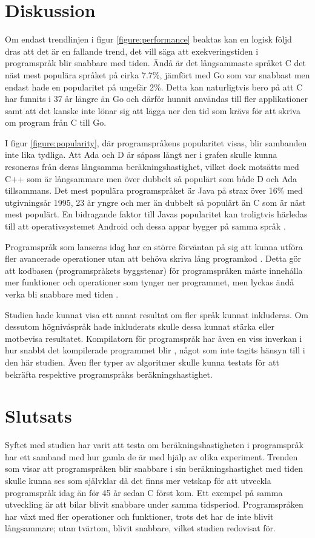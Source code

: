 \documentclass[12pt,swedish]{article}
\begin{document}
\section{Diskussion}
Om endast trendlinjen i figur \ref{figure:performance} beaktas kan en logisk följd dras att det är en fallande trend, det vill säga att exekveringstiden i programspråk blir snabbare med tiden. Ändå är det långsammaste språket C det näst mest populära språket på cirka 7.7\%, jämfört med Go som var snabbast men endast hade en popularitet på ungefär 2\%. Detta kan naturligtvis bero på att C har funnits i 37 år längre än Go och därför hunnit användas till fler applikationer samt att det kanske inte lönar sig att lägga ner den tid som krävs för att skriva om program från C till Go.

I figur \ref{figure:popularity}, där programspråkens popularitet visas, blir sambanden inte lika tydliga. Att Ada och D är såpass långt ner i grafen skulle kunna resoneras från deras långsamma beräkningshastighet, vilket dock motsätts med C++ som är långsammare men över dubbelt så populärt som både D och Ada tillsammans. Det mest populära programspråket är Java på strax över 16\% med utgivningsår 1995, 23 år yngre och mer än dubbelt så populärt än C som är näst mest populärt. En bidragande faktor till Javas popularitet kan troligtvis härledas till att operativsystemet Android och dessa appar bygger på samma språk \citep{gruman_2017}.

Programspråk som lanseras idag har en större förväntan på sig att kunna utföra fler avancerade operationer utan att behöva skriva lång programkod \citep{stroustrup_1997}. Detta gör att kodbasen (programspråkets byggstenar) för programspråken måste innehålla mer funktioner och operationer som tynger ner programmet, men lyckas ändå verka bli snabbare med tiden \citep{luong_2017}.

Studien hade kunnat visa ett annat resultat om fler språk kunnat inkluderas. Om dessutom högnivåspråk hade inkluderats skulle dessa kunnat stärka eller motbevisa resultatet. Kompilatorn för programspråk har även en viss inverkan i hur snabbt det kompilerade programmet blir \citep{srikant_shankar_2008}, något som inte tagits hänsyn till i den här studien. Även fler typer av algoritmer skulle kunna testats för att bekräfta respektive programspråks beräkningshastighet.


\section{Slutsats}
Syftet med studien har varit att testa om beräkningshastigheten i programspråk har ett samband med hur gamla de är med hjälp av olika experiment. Trenden som visar att programspråken blir snabbare i sin beräkningshastighet med tiden skulle kunna ses som självklar då det finns mer vetskap för att utveckla programspråk idag än för 45 år sedan C först kom. Ett exempel på samma utveckling är att bilar blivit snabbare under samma tidsperiod. Programspråken har växt med fler operationer och funktioner, trots det har de inte blivit långsammare; utan tvärtom, blivit snabbare, vilket studien redovisat för.
\end{document}
